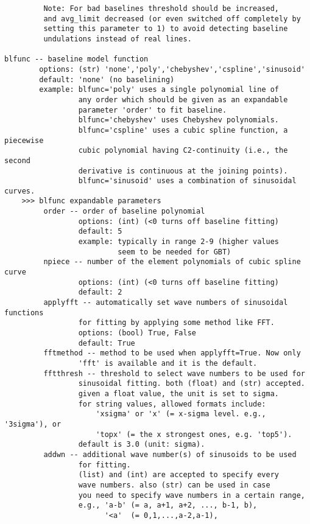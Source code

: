 \begin{verbatim}
         Note: For bad baselines threshold should be increased,
         and avg_limit decreased (or even switched off completely by
         setting this parameter to 1) to avoid detecting baseline
         undulations instead of real lines.

blfunc -- baseline model function
        options: (str) 'none','poly','chebyshev','cspline','sinusoid'
        default: 'none' (no baselining)
        example: blfunc='poly' uses a single polynomial line of 
                 any order which should be given as an expandable 
                 parameter 'order' to fit baseline. 
                 blfunc='chebyshev' uses Chebyshev polynomials. 
                 blfunc='cspline' uses a cubic spline function, a piecewise 
                 cubic polynomial having C2-continuity (i.e., the second 
                 derivative is continuous at the joining points).
                 blfunc='sinusoid' uses a combination of sinusoidal curves. 
    >>> blfunc expandable parameters
         order -- order of baseline polynomial
                 options: (int) (<0 turns off baseline fitting)
                 default: 5
                 example: typically in range 2-9 (higher values
                          seem to be needed for GBT)
         npiece -- number of the element polynomials of cubic spline curve
                 options: (int) (<0 turns off baseline fitting)
                 default: 2
         applyfft -- automatically set wave numbers of sinusoidal functions
                 for fitting by applying some method like FFT.
                 options: (bool) True, False
                 default: True
         fftmethod -- method to be used when applyfft=True. Now only
                 'fft' is available and it is the default.
         fftthresh -- threshold to select wave numbers to be used for
                 sinusoidal fitting. both (float) and (str) accepted.
                 given a float value, the unit is set to sigma.
                 for string values, allowed formats include:
                     'xsigma' or 'x' (= x-sigma level. e.g., '3sigma'), or
                     'topx' (= the x strongest ones, e.g. 'top5').
                 default is 3.0 (unit: sigma).
         addwn -- additional wave number(s) of sinusoids to be used
                 for fitting.
                 (list) and (int) are accepted to specify every
                 wave numbers. also (str) can be used in case
                 you need to specify wave numbers in a certain range,
                 e.g., 'a-b' (= a, a+1, a+2, ..., b-1, b),
                       '<a'  (= 0,1,...,a-2,a-1),

\end{verbatim}
